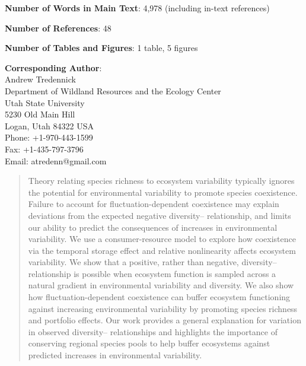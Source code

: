 \documentclass[12pt,]{article}
\begin{document}
\begin{singlespace}
\noindent \textbf{Number of Words in Main Text}: 4,978 (including in-text references)

\noindent \textbf{Number of References}: 48

\noindent \textbf{Number of Tables and Figures}: 1 table, 5 figures

\noindent \textbf{Corresponding Author}:  \\
\phantom{222}Andrew Tredennick  \\
\phantom{222}Department of Wildland Resources and the Ecology Center  \\
\phantom{222}Utah State University  \\
\phantom{222}5230 Old Main Hill  \\
\phantom{222}Logan, Utah 84322 USA  \\
\phantom{222}Phone: +1-970-443-1599  \\
\phantom{222}Fax: +1-435-797-3796  \\
\phantom{222}Email: atredenn@gmail.com

\end{singlespace}

\newpage{}

\linenumbers

\begin{abstract}
Theory relating species richness to ecosystem variability typically ignores the potential for environmental variability to promote species coexistence.
Failure to account for fluctuation-dependent coexistence may explain deviations from the expected negative diversity-- relationship, and limits our ability to predict the consequences of increases in environmental variability.
We use a consumer-resource model to explore how coexistence via the temporal storage effect and relative nonlinearity affects ecosystem variability.
We show that a positive, rather than negative, diversity-- relationship is possible when ecosystem function is sampled across a natural gradient in environmental variability and diversity.
We also show how fluctuation-dependent coexistence can buffer ecosystem functioning against increasing environmental variability by promoting species richness and portfolio effects.
Our work provides a general explanation for variation in observed diversity-- relationships and highlights the importance of conserving regional species pools to help buffer ecosystems against predicted increases in environmental variability.
\vspace{2em}
\end{abstract}
\end{document}
